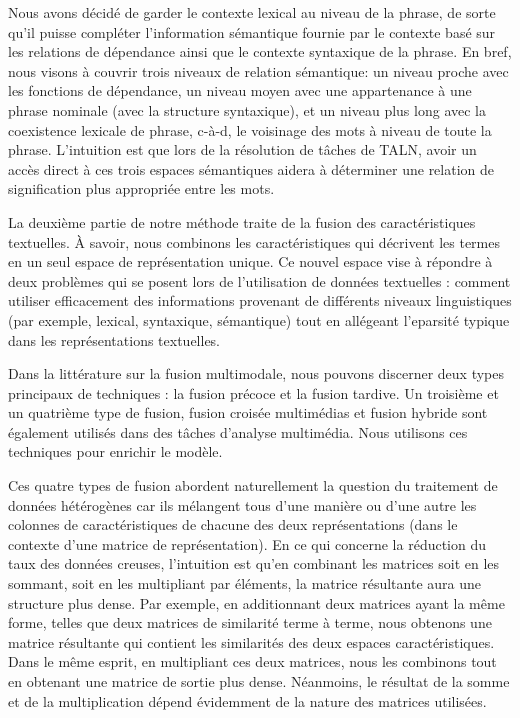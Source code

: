 \documentclass[a4paper,11pt,twoside]{article}
\begin{document}
Nous avons décidé de garder le contexte lexical au niveau de la phrase, de sorte qu'il puisse compléter l'information sémantique fournie par le contexte basé sur les relations de dépendance ainsi que le contexte syntaxique de la phrase. En bref, nous visons à couvrir trois niveaux de relation sémantique: un niveau proche avec les fonctions de dépendance, un niveau moyen avec une appartenance à une phrase nominale (avec la structure syntaxique), et un niveau plus long avec la coexistence lexicale de phrase, c-à-d, le voisinage des mots à niveau de toute la phrase. L'intuition est que lors de la résolution de tâches de TALN, avoir un accès direct à ces trois espaces sémantiques aidera à déterminer une relation de signification plus appropriée entre les mots.

La deuxième partie de notre méthode traite de la fusion des caractéristiques textuelles. À savoir, nous combinons les caractéristiques qui décrivent les termes en un seul espace de représentation unique. Ce nouvel espace vise à répondre à deux problèmes qui se posent lors de l'utilisation de données textuelles : comment utiliser efficacement des informations provenant de différents niveaux linguistiques (par exemple, lexical, syntaxique, sémantique) tout en allégeant l'eparsité typique dans les représentations textuelles. 

Dans la littérature sur la fusion multimodale, nous pouvons discerner deux types principaux de techniques : la fusion précoce et la fusion tardive. Un troisième et un quatrième type de fusion, fusion croisée multimédias et fusion hybride sont également utilisés dans des tâches d'analyse multimédia. Nous utilisons ces techniques pour enrichir le modèle.

Ces quatre types de fusion abordent naturellement la question du traitement de données hétérogènes car ils mélangent tous d'une manière ou d'une autre les colonnes de caractéristiques de chacune des deux représentations (dans le contexte d'une matrice de représentation). En ce qui concerne la réduction du taux des données creuses, l'intuition est qu'en combinant les matrices soit en les sommant, soit en les multipliant par éléments, la matrice résultante aura une structure plus dense. Par exemple, en additionnant deux matrices ayant la même forme, telles que deux matrices de similarité terme à terme, nous obtenons une matrice résultante qui contient les similarités des deux espaces caractéristiques. Dans le même esprit, en multipliant ces deux matrices, nous les combinons tout en obtenant une matrice de sortie plus dense. Néanmoins, le résultat de la somme et de la multiplication dépend évidemment de la nature des matrices utilisées.
\end{document}
